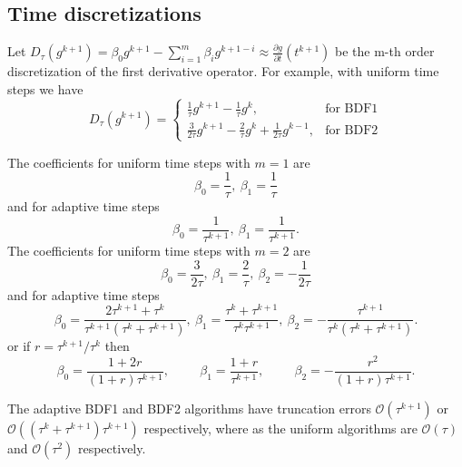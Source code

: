\documentclass[letterpaper]{erdc}
\begin{document}
\subsection{Time discretizations}
Let $D_{\tau} \left(g^{k+1}\right) = \beta_0g^{k+1} - \displaystyle\sum_{i=1}^{m} \beta_i g^{k+1-i} \approx \frac{\partial g}{\partial t}(t^{k+1})$ be the m-th order discretization of the first derivative operator.  For example, with uniform time steps we have
\begin{equation}
 D_{\tau}\left( g^{k+1}\right) = \begin{cases}
 \frac{1}{\tau}g^{k+1} - \frac{1}{\tau} g^{k},  & \mbox{for BDF1}\\
  \frac{3}{2\tau}g^{k+1} - \frac{2}{\tau} g^{k} + \frac{1}{2\tau}g^{k-1}, &\mbox{for BDF2}
  \end{cases}
\end{equation}

The coefficients for uniform time steps with $m=1$ are
\begin{equation}
 \beta_0 = \frac{1}{\tau},\: \beta_1 = \frac{1}{\tau}
\end{equation}
and for adaptive time steps
\begin{equation}
 \beta_0 = \frac{1}{\tau^{k+1}},\: \beta_1 = \frac{1}{\tau^{k+1}}.
\end{equation}
The coefficients for uniform time steps with $m=2$ are
\begin{equation}
   \beta_0 = \frac{3}{2\tau}, \: \beta_1 = \frac{2}{\tau}, \: \beta_2 = -\frac{1}{2\tau} 
\end{equation}
and for adaptive time steps
\begin{equation}
   \beta_0 = \frac{2\tau^{k+1}+\tau^{k}}{\tau^{k+1}\left(\tau^{k} + \tau^{k+1}\right)}, \: \beta_1 = \frac{\tau^{k} + \tau^{k+1}}{\tau^{k}\tau^{k+1}}, \: \beta_2 = -\frac{\tau^{k+1}}{\tau^{k}\left(\tau^{k}+\tau^{k+1}\right)}.
\end{equation}
or if $r=\tau^{k+1}/\tau^{k}$ then
\begin{equation}
   \beta_0 = \frac{1+2r}{(1+r)\tau^{k+1}}, \hspace{1cm} \beta_1 = \frac{1+r}{\tau^{k+1}}, \hspace{1cm} \beta_2 = -\frac{r^2}{(1+r)\tau^{k+1}}.
\end{equation}

The adaptive BDF1 and BDF2 algorithms have truncation errors $\mathcal{O}\left(\tau^{k+1}\right)$ or $\mathcal{O}\left(\left(\tau^{k}+\tau^{k+1} \right)\tau^{k+1} \right)$ respectively, where as the uniform algorithms are $\mathcal{O}(\tau)$ and $\mathcal{O}(\tau^{2})$ respectively.
  
\end{document}
